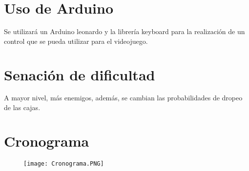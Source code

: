 \documentclass{article}
\begin{document}
\section{Uso de Arduino}
Se utilizará un Arduino leonardo y la librería keyboard para la realización de un control que se pueda utilizar para el videojuego.

\section{Senación de dificultad}
A mayor nivel, más enemigos, además, se cambian las probabilidades de dropeo de las cajas.

\section{Cronograma}
\begin{figure}[h]
\texttt{[image: Cronograma.PNG]}
\centering
\label{fig:Colombia}
\end{figure}
\end{document}
